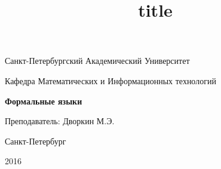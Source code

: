 \thispagestyle{empty}
\title{title}
	\begin{center}
		Санкт-Петербургский Академический Университет
		
		Кафедра Математических и Информационных технологий
		
		\vspace{180pt}
		
		
		\textbf{\large{Формальные языки}}
		
		\vspace{270pt}
		
	\end{center}
	
	\begin{flushright}
		\begin{tabbing}
			Преподаватель: Дворкин М.Э.\\
		\end{tabbing}
	\end{flushright}
	
	\begin{center}
		\vspace{\fill}
		Санкт-Петербург
		
		2016
	\end{center}
